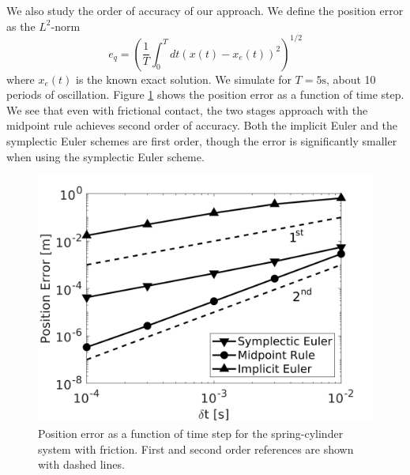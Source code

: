 We also study the order of accuracy of our approach. We define the position error as the $L^2$-norm
\begin{equation*}
    e_q = \left(\frac{1}{T}\int_0^T dt(x(t)-x_e(t))^2\right)^{1/2}
\end{equation*}
where $x_e(t)$ is the known exact solution. We simulate for $T=5\text{
s}$, about 10 periods of oscillation. Figure \ref{fig:spring_cylinder_position_error} shows the position error as
a function of time step. We see that even with frictional contact, the two
stages approach with the midpoint rule achieves second order of accuracy. Both the implicit Euler and the symplectic Euler schemes are first order,
though the error is significantly smaller when using the symplectic Euler
scheme.
\begin{figure}[!h]
	\centering
	\includegraphics[width=0.6\columnwidth]{figures/spring_cylinder/position_error.png}
	\caption{\label{fig:spring_cylinder_position_error} 
	Position error as a function of time step for the spring-cylinder system
	with friction. First and second order references are shown with dashed
	lines.}
\end{figure}